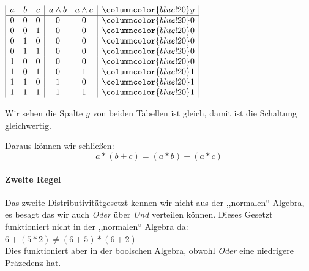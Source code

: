 \documentclass{article}
\begin{document}
\begin{minipage}{.48\linewidth}
\begin{multicols}{2}
            $\begin{array}{|c c c | c c | >{\columncolor{blue!20}}c |}
                a & b & c & a \land b & a \land c &  y \\
                \hline 
                0 & 0 & 0 & 0 &0 & 0 \\
                0 & 0 & 1 & 0 &0 &0 \\
                0 & 1 & 0 & 0 & 0 &0 \\
                0 & 1 & 1 & 0 & 0 &0\\
                1 & 0 & 0 & 0 &0 &0\\ 
                1 & 0& 1 & 0 & 1 & 1 \\ 
                1 & 1 & 0 & 1 & 0 & 1 \\
                1 & 1 & 1 &  1 &1 & 1 \\
            \end{array}$ \\ 
        \end{multicols}
\end{minipage}

\vspace{2em}
Wir sehen die Spalte $y$ von beiden Tabellen ist gleich, damit ist die Schaltung gleichwertig.

\begin{info}
    Daraus können wir schließen: 
    \begin{equation*}
        a * (b + c) =   (a * b) + (a * c)
    \end{equation*}
\end{info}


\paragraph{Zweite Regel} Das zweite Distributivitätgesetzt kennen wir nicht aus der ,,normalen`` Algebra, es besagt das wir auch
\emph{Oder} über \emph{Und} verteilen können. Dieses Gesetzt funktioniert nicht in der ,,normalen`` Algebra da: $6+(5*2)\neq(6+5)*(6+2)$
\\
Dies funktioniert aber in der boolschen Algebra, obwohl \emph{Oder} eine niedrigere Präzedenz hat. 
\end{document}
